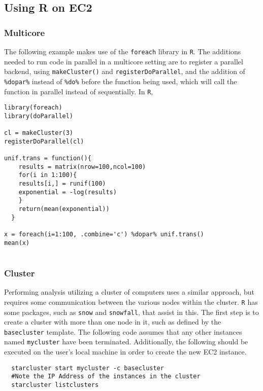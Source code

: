 \documentclass[12pt, letterpaper]{article}
\newcommand{\R}{\texttt{R}} %
\begin{document}
\subsection*{Using R on EC2}

\subsubsection*{Multicore}

The following example makes use of the \texttt{foreach} library in \R. The additions needed 
to run code in parallel in a multicore setting are to register a parallel backend, using \texttt{makeCluster()}
and \texttt{registerDoParallel}, and
the addition of \texttt{\%dopar\%} instead of \texttt{\%do\%} before the function being used, which will
call the function in parallel instead of sequentially. In \texttt{R},

\begin{lstlisting} 
library(foreach)
library(doParallel)

cl = makeCluster(3)
registerDoParallel(cl)

unif.trans = function(){
    results = matrix(nrow=100,ncol=100)
    for(i in 1:100){
    results[i,] = runif(100) 
    exponential = -log(results)
    }
    return(mean(exponential))
  }

x = foreach(i=1:100, .combine='c') %dopar% unif.trans()
mean(x)
   
\end{lstlisting}

\subsubsection*{Cluster}

Performing analysis utilizing a cluster of computers uses a similar approach, but requires some communication between
the various nodes within the cluster. \texttt{R} has some packages, such as \texttt{snow} and \texttt{snowfall}, that assist
in this. The first step is to create a cluster with more than one node in it, such as defined by the 
\texttt{basecluster} template. The following code assumes that any other instances named \texttt{mycluster} have been
terminated. Additionally, the following should be executed on the user's local machine in order to create the new
EC2 instance. 

\begin{verbatim}
  starcluster start mycluster -c basecluster
  #Note the IP Address of the instances in the cluster
  starcluster listclusters
\end{verbatim}
\end{document}
